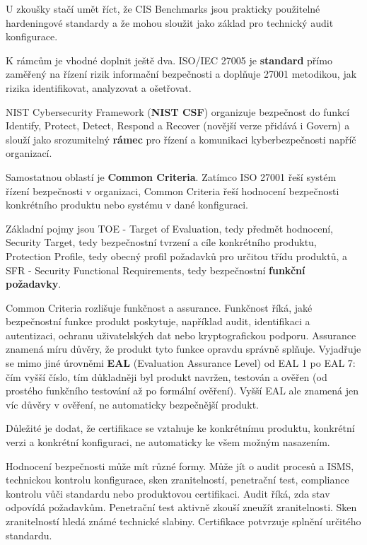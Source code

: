 U zkoušky stačí umět říct, že CIS Benchmarks jsou prakticky použitelné hardeningové standardy a že mohou sloužit jako základ pro technický audit konfigurace.

K rámcům je vhodné doplnit ještě dva. ISO/IEC 27005 je \textbf{standard} přímo zaměřený na řízení rizik informační bezpečnosti a doplňuje 27001 metodikou, jak rizika identifikovat, analyzovat a ošetřovat.

NIST Cybersecurity Framework (\textbf{NIST CSF}) organizuje bezpečnost do funkcí Identify, Protect, Detect, Respond a Recover (novější verze přidává i Govern) a slouží jako srozumitelný \textbf{rámec} pro řízení a komunikaci kyberbezpečnosti napříč organizací.

Samostatnou oblastí je \textbf{Common Criteria}. Zatímco ISO 27001 řeší systém řízení bezpečnosti v organizaci, Common Criteria řeší hodnocení bezpečnosti konkrétního produktu nebo systému v dané konfiguraci.

Základní pojmy jsou TOE - Target of Evaluation, tedy předmět hodnocení, Security Target, tedy bezpečnostní tvrzení a cíle konkrétního produktu, Protection Profile, tedy obecný profil požadavků pro určitou třídu produktů, a SFR - Security Functional Requirements, tedy bezpečnostní \textbf{funkční požadavky}.

Common Criteria rozlišuje funkčnost a assurance. Funkčnost říká, jaké bezpečnostní funkce produkt poskytuje, například audit, identifikaci a autentizaci, ochranu uživatelských dat nebo kryptografickou podporu. Assurance znamená míru důvěry, že produkt tyto funkce opravdu správně splňuje. Vyjadřuje se mimo jiné úrovněmi \textbf{EAL} (Evaluation Assurance Level) od EAL 1 po EAL 7: čím vyšší číslo, tím důkladněji byl produkt navržen, testován a ověřen (od prostého funkčního testování až po formální ověření). Vyšší EAL ale znamená jen víc důvěry v ověření, ne automaticky bezpečnější produkt.

Důležité je dodat, že certifikace se vztahuje ke konkrétnímu produktu, konkrétní verzi a konkrétní konfiguraci, ne automaticky ke všem možným nasazením.

Hodnocení bezpečnosti může mít různé formy. Může jít o audit procesů a ISMS, technickou kontrolu konfigurace, sken zranitelností, penetrační test, compliance kontrolu vůči standardu nebo produktovou certifikaci. Audit říká, zda stav odpovídá požadavkům. Penetrační test aktivně zkouší zneužít zranitelnosti. Sken zranitelností hledá známé technické slabiny. Certifikace potvrzuje splnění určitého standardu.

